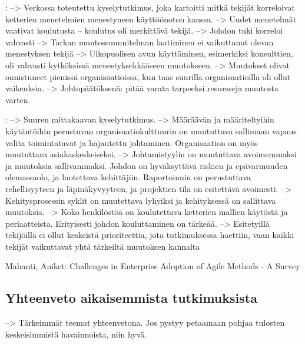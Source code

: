 :
--> Verkossa toteutettu kyselytutkimus, joka kartoitti mitkä tekijät korreloivat
ketterien menetelmien menestyneen käyttöönoton kanssa. \newline
--> Uudet menetelmät vaativat koulutusta -- koulutus oli merkittävä tekijä. \newline
--> Johdon tuki korreloi vahvasti \newline
--> Tarkan muutossuunnitelman laatiminen ei vaikuttanut olevan menestyksen tekijä \newline
--> Ulkopuolisen avun käyttäminen, esimerkiksi konsulttien, oli vahvasti
kytköksissä menestyksekkääseen muutokseen. \newline
--> Muutokset olivat onnistuneet pienissä organisaatioissa, kun taas suurilla
organisaatioilla oli ollut vaikeuksia. \newline
--> Johtopäätöksenä: pitää varata tarpeeksi resursseja muutosta varten.

:
--> Suuren mittakaavan kyselytutkimus. \newline
--> Määräävän ja määriteltyihin käytäntöihin perustuvan organisaatiokulttuurin
on muututtava sallimaan vapaus valita toimintatavat ja hajautettu johtaminen.
Organisaation on myös muututtava asiakaskeskeiseksi. \newline
--> Johtamistyylin on muututtava avoimemmaksi ja muutoksia sallivammaksi. Johdon
on hyväksyttävä riskien ja epävarmuuden olemassaolo, ja luotettava kehittäjiin.
Raportoinnin on perustuttava rehellisyyteen ja läpinäkyvyyteen, ja projektien
tila on esitettävä avoimesti. \newline 
--> Kehitysprosessin syklit on muutettava lyhyiksi ja kehityksessä on sallittava
muutoksia. \newline
--> Koko henkilöstöä on koulutettava ketterien mallien käytöstä ja periaatteista.
Erityisesti johdon kouluttaminen on tärkeää. \newline
--> Esitetyillä tekijöillä ei ollut keskeistä prioriteettia, jota tutkimuksessa
haettiin, vaan kaikki tekijät vaikuttavat yhtä tärkeiltä muutoksen kannalta

Mahanti, Aniket: Challenges in Enterprise Adoption of Agile Methods - A Survey

\subsection{Yhteenveto aikaisemmista tutkimuksista}

--> Tärkeimmät teemat yhteenvetona. Jos pystyy petaamaan pohjaa tulosten
keskeisimmistä havainnoista, niin hyvä.

